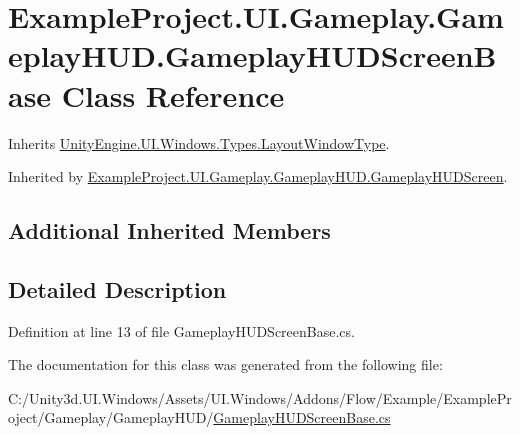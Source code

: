 \hypertarget{class_example_project_1_1_u_i_1_1_gameplay_1_1_gameplay_h_u_d_1_1_gameplay_h_u_d_screen_base}{}\section{Example\+Project.\+U\+I.\+Gameplay.\+Gameplay\+H\+U\+D.\+Gameplay\+H\+U\+D\+Screen\+Base Class Reference}
\label{class_example_project_1_1_u_i_1_1_gameplay_1_1_gameplay_h_u_d_1_1_gameplay_h_u_d_screen_base}


Inherits \hyperlink{class_unity_engine_1_1_u_i_1_1_windows_1_1_types_1_1_layout_window_type}{Unity\+Engine.\+U\+I.\+Windows.\+Types.\+Layout\+Window\+Type}.



Inherited by \hyperlink{class_example_project_1_1_u_i_1_1_gameplay_1_1_gameplay_h_u_d_1_1_gameplay_h_u_d_screen}{Example\+Project.\+U\+I.\+Gameplay.\+Gameplay\+H\+U\+D.\+Gameplay\+H\+U\+D\+Screen}.

\subsection*{Additional Inherited Members}


\subsection{Detailed Description}


Definition at line 13 of file Gameplay\+H\+U\+D\+Screen\+Base.\+cs.



The documentation for this class was generated from the following file\+:\begin{DoxyCompactItemize}
\item 
C\+:/\+Unity3d.\+U\+I.\+Windows/\+Assets/\+U\+I.\+Windows/\+Addons/\+Flow/\+Example/\+Example\+Project/\+Gameplay/\+Gameplay\+H\+U\+D/\hyperlink{_gameplay_h_u_d_screen_base_8cs}{Gameplay\+H\+U\+D\+Screen\+Base.\+cs}\end{DoxyCompactItemize}
